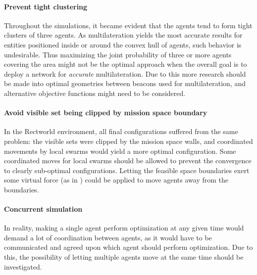 \paragraph{Prevent tight clustering}
Throughout the simulations, it became evident that the agents tend to form tight clusters of three agents.
As multilateration yields the most accurate results for entities positioned inside or around the convex hull of agents,
such behavior is undesirable. Thus maximizing the joint probability of three or more agents covering the area might not be the 
optimal approach when the overall goal is to deploy a network for \emph{accurate} multilateration. Due to this more research should be made into
optimal geometries between beacons used for multilateration, and alternative objective functions might need to be considered.

\paragraph{Avoid visible set being clipped by mission space boundary}
In the Rectworld environment, all final configurations suffered from the same problem: the visible sets were clipped by the mission
space walls, and coordinated movements by local swarms would yield a more optimal configuration. 
Some coordinated moves for local swarms should be allowed to prevent the convergence to 
clearly sub-optimal configurations. Letting the feasible space boundaries exert some virtual force (as in \cite{pot_field}) could be 
applied to move agents away from the boundaries.

\paragraph{Concurrent simulation} In reality, making a single agent perform optimization at any given time would demand
a lot of coordination between agents, as it would have to be communicated and agreed upon which agent should perform optimization.
Due to this, the possibility of letting multiple agents move at the same time should be investigated.